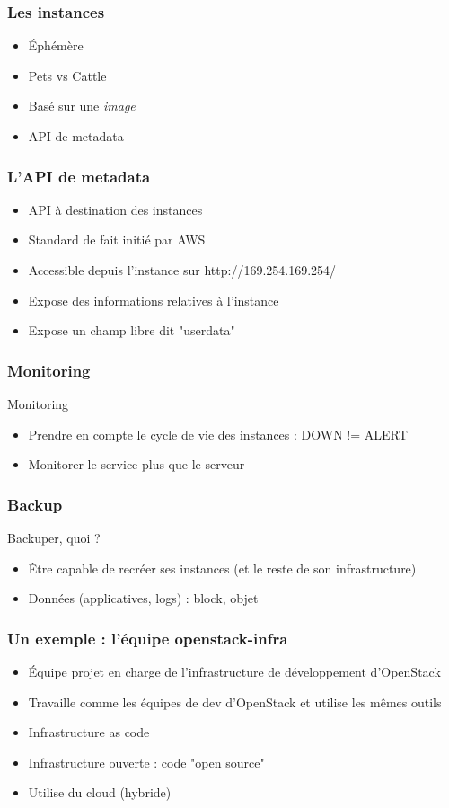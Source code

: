   \begin{frame}
    \frametitle{Les instances}
    \begin{itemize}
      \item Éphémère
      \item Pets vs Cattle
      \item Basé sur une \textit{image}
      \item API de metadata
    \end{itemize}
  \end{frame}

  \begin{frame}
    \frametitle{L'API de metadata}
    \begin{itemize}
      \item API à destination des instances
      \item Standard de fait initié par AWS
      \item Accessible depuis l'instance sur http://169.254.169.254/
      \item Expose des informations relatives à l'instance
      \item Expose un champ libre dit "userdata"
    \end{itemize}
  \end{frame}

  \begin{frame}
    \frametitle{Monitoring}
    Monitoring
    \begin{itemize}
      \item Prendre en compte le cycle de vie des instances : DOWN != ALERT
      \item Monitorer le service plus que le serveur
    \end{itemize}
  \end{frame}

  \begin{frame}
    \frametitle{Backup}
    Backuper, quoi ?
    \begin{itemize}
      \item Être capable de recréer ses instances (et le reste de son infrastructure)
      \item Données (applicatives, logs) : block, objet
    \end{itemize}
  \end{frame}

  \begin{frame}
    \frametitle{Un exemple : l'équipe openstack-infra}
    \begin{itemize}
      \item Équipe projet en charge de l'infrastructure de développement d'OpenStack
      \item Travaille comme les équipes de dev d'OpenStack et utilise les mêmes outils
      \item Infrastructure as code
      \item Infrastructure ouverte : code "open source"
      \item Utilise du cloud (hybride)
    \end{itemize}
  \end{frame}
